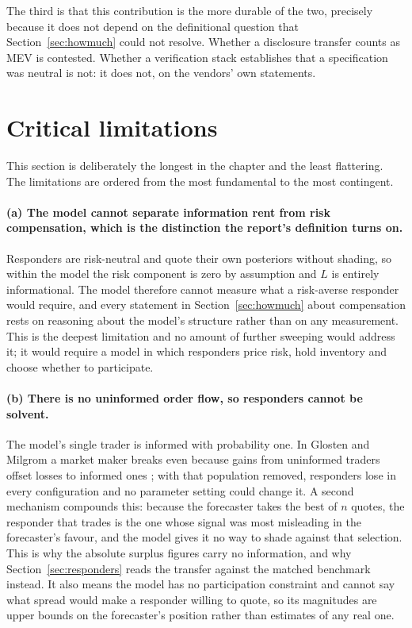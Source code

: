 The third is that this contribution is the more durable of the two, precisely because it
does not depend on the definitional question that Section~\ref{sec:howmuch} could not
resolve. Whether a disclosure transfer counts as MEV is contested. Whether a verification
stack establishes that a specification was neutral is not: it does not, on the vendors' own
statements.

\section{Critical limitations}
\label{sec:limitations}

This section is deliberately the longest in the chapter and the least flattering. The
limitations are ordered from the most fundamental to the most contingent.

\paragraph{(a) The model cannot separate information rent from risk compensation, which is
the distinction the report's definition turns on.} Responders are risk-neutral and quote
their own posteriors without shading, so within the model the risk component is zero by
assumption and $L$ is entirely informational. The model therefore cannot measure what a risk-averse responder
would require, and every statement in Section~\ref{sec:howmuch} about compensation rests on
reasoning about the model's structure rather than on any measurement. This is the deepest
limitation and no amount of further sweeping would address it; it would require a model in
which responders price risk, hold inventory and choose whether to participate.

\paragraph{(b) There is no uninformed order flow, so responders cannot be solvent.} The
model's single trader is informed with probability one. In Glosten and Milgrom a market
maker breaks even because gains from uninformed traders offset losses to informed ones
\cite{glosten1985bidask}; with that population removed, responders lose in every
configuration and no parameter setting could change it. A second mechanism compounds this:
because the forecaster takes the best of $n$ quotes, the responder that trades is the one
whose signal was most misleading in the forecaster's favour, and the model gives it no way to
shade against that selection. This is why the absolute surplus
figures carry no information, and why Section~\ref{sec:responders} reads the transfer
against the matched benchmark instead. It also means the model has no participation
constraint and cannot say what spread would make a responder willing to quote, so its
magnitudes are upper bounds on the forecaster's position rather than estimates of any real
one.

